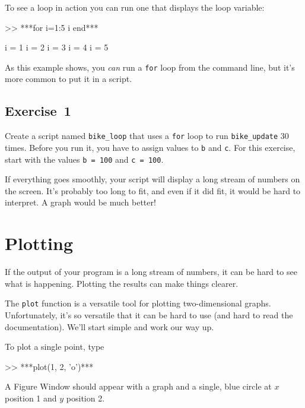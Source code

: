 
To see a loop in action you can run one that displays the
loop variable:

\begin{code}
>> ***for i=1:5
    i
end***

i = 1
i = 2
i = 3
i = 4
i = 5
\end{code}

As this example shows, you {\em can} run a \lstinline{for} loop from the
command line, but it's more common to put it in a script.

\subsection{Exercise~1}
Create a script named \lstinline{bike_loop} that uses a \lstinline{for} loop to run \lstinline{bike_update} 30 times.  Before you run it, you have to assign values to \lstinline{b} and \lstinline{c}.
For this exercise, start with the values \lstinline{b = 100} and \lstinline{c = 100}.

If everything goes smoothly, your script will display a long stream
of numbers on the screen.  It's probably too long
to fit, and even if it did fit, it would be hard to interpret.
A graph would be much better!



\section{Plotting}
\label{plotting}


If the output of your program is a long stream of numbers, it can be hard to see what is happening.
Plotting the results can make things clearer.

The \lstinline{plot} function is a versatile tool for plotting two-dimensional graphs.  Unfortunately, it's so versatile that it can be hard to use (and hard to read the documentation).
We'll start simple and work our way up.

To plot a single point, type

\begin{code}
>> ***plot(1, 2, 'o')***
\end{code}

A Figure Window should appear with a graph and a single, blue circle at $x$ position 1 and $y$ position 2.  

